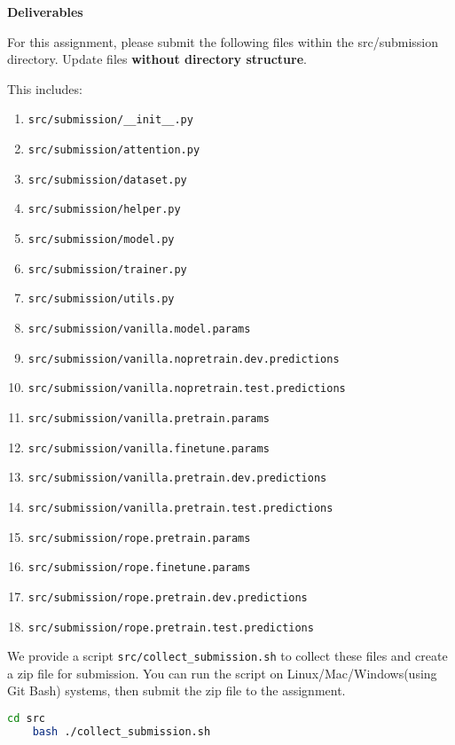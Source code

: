 

\pagebreak

\textbf{Deliverables}

For this assignment, please submit the following files within the src/submission directory.
Update files \textbf{without directory structure}.

This includes:

\begin{enumerate}
        \item \texttt{src/submission/\_\_init\_\_.py}
        \item \texttt{src/submission/attention.py}
        \item \texttt{src/submission/dataset.py}
        \item \texttt{src/submission/helper.py}
        \item \texttt{src/submission/model.py}
        \item \texttt{src/submission/trainer.py}
        \item \texttt{src/submission/utils.py}
        \item \texttt{src/submission/vanilla.model.params}
        \item \texttt{src/submission/vanilla.nopretrain.dev.predictions}
        \item \texttt{src/submission/vanilla.nopretrain.test.predictions}
        \item \texttt{src/submission/vanilla.pretrain.params}
        \item \texttt{src/submission/vanilla.finetune.params}
        \item \texttt{src/submission/vanilla.pretrain.dev.predictions}
        \item \texttt{src/submission/vanilla.pretrain.test.predictions}
        \item \texttt{src/submission/rope.pretrain.params}
        \item \texttt{src/submission/rope.finetune.params}
        \item \texttt{src/submission/rope.pretrain.dev.predictions}
        \item \texttt{src/submission/rope.pretrain.test.predictions}
\end{enumerate}

We provide a script \texttt{src/collect\_submission.sh} to collect these files and create a zip file for submission. You can run the script on Linux/Mac/Windows(using Git Bash) systems, then submit the zip file to the assignment.

\begin{lstlisting}[language=bash]
    cd src
    bash ./collect_submission.sh
\end{lstlisting}